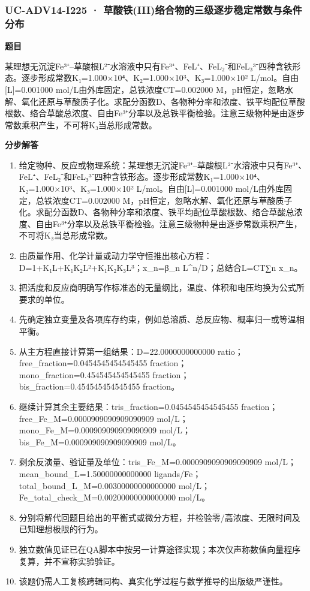 \documentclass[UTF8,11pt,a4paper]{ctexart}
\begin{document}
\subsubsection*{UC-ADV14-I225 · 草酸铁(III)络合物的三级逐步稳定常数与条件分布}
\noindent\textbf{题目}\par
某理想无沉淀Fe³⁺–草酸根L²⁻水溶液中只有Fe³⁺、FeL⁺、FeL₂⁻和FeL₃³⁻四种含铁形态。逐步形成常数K₁=1.000×10⁴、K₂=1.000×10³、K₃=1.000×10² L/mol。自由[L]=0.001000 mol/L由外库固定，总铁浓度CT=0.002000 M，pH恒定，忽略水解、氧化还原与草酸质子化。求配分函数D、各物种分率和浓度、铁平均配位草酸根数、络合草酸总浓度、自由Fe³⁺分率以及总铁平衡检验。注意三级物种是由逐步常数乘积产生，不可将K₃当总形成常数。\par
\medskip\noindent\textbf{分步解答}
\begin{enumerate}
\item 给定物种、反应或物理系统：某理想无沉淀Fe³⁺–草酸根L²⁻水溶液中只有Fe³⁺、FeL⁺、FeL₂⁻和FeL₃³⁻四种含铁形态。逐步形成常数K₁=1.000×10⁴、K₂=1.000×10³、K₃=1.000×10² L/mol。自由[L]=0.001000 mol/L由外库固定，总铁浓度CT=0.002000 M，pH恒定，忽略水解、氧化还原与草酸质子化。求配分函数D、各物种分率和浓度、铁平均配位草酸根数、络合草酸总浓度、自由Fe³⁺分率以及总铁平衡检验。注意三级物种是由逐步常数乘积产生，不可将K₃当总形成常数。
\item 由质量作用、化学计量或动力学守恒推出核心方程：D=1+K₁L+K₁K₂L²+K₁K₂K₃L³；x\_n=β\_n L\textasciicircum{}n/D；总结合L=CT∑n x\_n。
\item 把活度和反应商明确写作标准态的无量纲比，温度、体积和电压均换为公式所要求的单位。
\item 先确定独立变量及各项库存约束，例如总溶质、总反应物、概率归一或等温相平衡。
\item 从主方程直接计算第一组结果：D=22.0000000000000 ratio；free\_fraction=0.0454545454545455 fraction；mono\_fraction=0.454545454545455 fraction；bis\_fraction=0.454545454545455 fraction。
\item 继续计算其余主要结果：tris\_fraction=0.0454545454545455 fraction；free\_Fe\_M=0.0000909090909090909 mol/L；mono\_Fe\_M=0.000909090909090909 mol/L；bis\_Fe\_M=0.000909090909090909 mol/L。
\item 剩余反演量、验证量及单位：tris\_Fe\_M=0.0000909090909090909 mol/L；mean\_bound\_L=1.50000000000000 ligands/Fe；total\_bound\_L\_M=0.00300000000000000 mol/L；Fe\_total\_check\_M=0.00200000000000000 mol/L。
\item 分别将解代回题目给出的平衡式或微分方程，并检验零/高浓度、无限时间及已知理想极限的行为。
\item 独立数值见证已在QA脚本中按另一计算途径实现；本次仅声称数值向量程序复算，并不宣称实验验证。
\item 该题仍需人工复核跨辑同构、真实化学过程与数学推导的出版级严谨性。
\end{enumerate}
\end{document}
